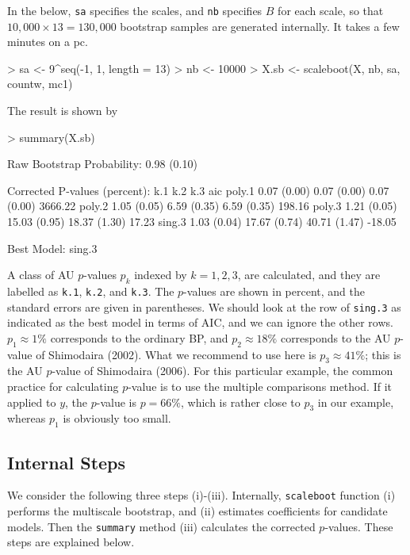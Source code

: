 \documentclass[a4paper]{amsart}
\begin{document}
In the below, {\tt sa} specifies the scales, and {\tt nb} specifies
$B$ for each scale, so that $10,000\times13=130,000$ bootstrap samples
are generated internally.  It takes a few minutes on a pc.
\begin{Schunk}
\begin{Sinput}
> sa <- 9^seq(-1, 1, length = 13)
> nb <- 10000
> X.sb <- scaleboot(X, nb, sa, countw, mc1)
\end{Sinput}
\end{Schunk}
The result is shown by
\begin{Schunk}
\begin{Sinput}
> summary(X.sb)
\end{Sinput}
\begin{Soutput}
Raw Bootstrap Probability:  0.98 (0.10) 

Corrected P-values (percent):
       k.1         k.2          k.3          aic     
poly.1 0.07 (0.00)  0.07 (0.00)  0.07 (0.00) 3666.22 
poly.2 1.05 (0.05)  6.59 (0.35)  6.59 (0.35)  198.16 
poly.3 1.21 (0.05) 15.03 (0.95) 18.37 (1.30)   17.23 
sing.3 1.03 (0.04) 17.67 (0.74) 40.71 (1.47)  -18.05 

Best Model:  sing.3 
\end{Soutput}
\end{Schunk}

A class of AU $p$-values $p_k$ indexed by $k=1,2,3$, are calculated,
and they are labelled as {\tt k.1}, {\tt k.2}, and {\tt k.3}.  The
$p$-values are shown in percent, and the standard errors are given in
parentheses.  We should look at the row of {\tt sing.3} as indicated
as the best model in terms of AIC, and we can ignore the other
rows. $p_1\approx 1\%$ corresponds to the ordinary BP, and $p_2\approx
18\%$ corresponds to the AU $p$-value of Shimodaira (2002).  What we
recommend to use here is $p_3\approx41\%$; this is the AU $p$-value of
Shimodaira (2006).  For this particular example, the common practice
for calculating $p$-value is to use the multiple comparisons
method. If it applied to $y$, the $p$-value is $p=66\%$, which is
rather close to $p_3$ in our example, whereas $p_1$ is obviously too
small.

\subsection{Internal Steps}

We consider the following three steps (i)-(iii).
Internally, {\tt scaleboot} function (i) performs the multiscale
bootstrap, and (ii) estimates coefficients for candidate models. Then
the {\tt summary} method (iii) calculates the corrected $p$-values.
These steps are explained below.
\end{document}
